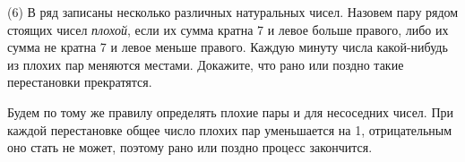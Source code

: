 \textsf{(6)}
В ряд записаны несколько различных натуральных чисел.
Назовем пару рядом стоящих чисел \emph{плохой}, если их сумма кратна 7 и левое
больше правого, либо их сумма не кратна 7 и левое меньше правого.
Каждую минуту числа какой-нибудь из плохих пар меняются местами.
Докажите, что рано или поздно такие перестановки прекратятся.

\solution
Будем по тому же правилу определять плохие пары и для несоседних чисел.
При каждой перестановке общее число плохих пар уменьшается на 1, отрицательным
оно стать не может, поэтому рано или поздно процесс закончится.

